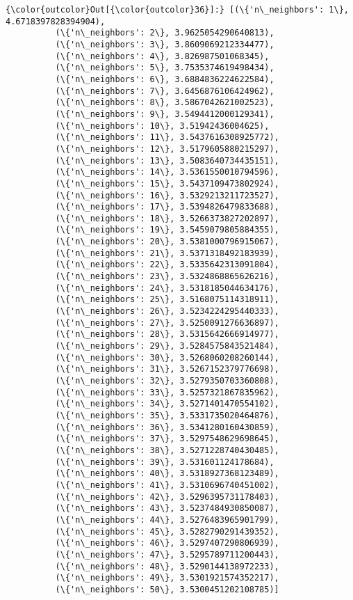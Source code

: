 \documentclass[11pt]{article}
\begin{document}
            \begin{Verbatim}[commandchars=\\\{\}]
{\color{outcolor}Out[{\color{outcolor}36}]:} [(\{'n\_neighbors': 1\}, 4.6718397828394904),
          (\{'n\_neighbors': 2\}, 3.9625054290640813),
          (\{'n\_neighbors': 3\}, 3.8609069212334477),
          (\{'n\_neighbors': 4\}, 3.826987501068345),
          (\{'n\_neighbors': 5\}, 3.7535374619498434),
          (\{'n\_neighbors': 6\}, 3.6884836224622584),
          (\{'n\_neighbors': 7\}, 3.6456876106424962),
          (\{'n\_neighbors': 8\}, 3.5867042621002523),
          (\{'n\_neighbors': 9\}, 3.5494412000129341),
          (\{'n\_neighbors': 10\}, 3.51942436004625),
          (\{'n\_neighbors': 11\}, 3.5437616308925772),
          (\{'n\_neighbors': 12\}, 3.5179605880215297),
          (\{'n\_neighbors': 13\}, 3.5083640734435151),
          (\{'n\_neighbors': 14\}, 3.5361550010794596),
          (\{'n\_neighbors': 15\}, 3.5437109473802924),
          (\{'n\_neighbors': 16\}, 3.5329213211723527),
          (\{'n\_neighbors': 17\}, 3.5394826479833688),
          (\{'n\_neighbors': 18\}, 3.5266373827202897),
          (\{'n\_neighbors': 19\}, 3.5459079805884355),
          (\{'n\_neighbors': 20\}, 3.5381000796915067),
          (\{'n\_neighbors': 21\}, 3.5371318492183939),
          (\{'n\_neighbors': 22\}, 3.5335642313091804),
          (\{'n\_neighbors': 23\}, 3.5324868865626216),
          (\{'n\_neighbors': 24\}, 3.5318185044634176),
          (\{'n\_neighbors': 25\}, 3.5168075114318911),
          (\{'n\_neighbors': 26\}, 3.5234224295440333),
          (\{'n\_neighbors': 27\}, 3.5250091276636897),
          (\{'n\_neighbors': 28\}, 3.5315642666914977),
          (\{'n\_neighbors': 29\}, 3.5284575843521484),
          (\{'n\_neighbors': 30\}, 3.5268060208260144),
          (\{'n\_neighbors': 31\}, 3.5267152379776698),
          (\{'n\_neighbors': 32\}, 3.5279350703360808),
          (\{'n\_neighbors': 33\}, 3.5257321867835962),
          (\{'n\_neighbors': 34\}, 3.5271401470554102),
          (\{'n\_neighbors': 35\}, 3.5331735020464876),
          (\{'n\_neighbors': 36\}, 3.5341280160430859),
          (\{'n\_neighbors': 37\}, 3.5297548629698645),
          (\{'n\_neighbors': 38\}, 3.5271228740430485),
          (\{'n\_neighbors': 39\}, 3.531601124178684),
          (\{'n\_neighbors': 40\}, 3.5318927368123489),
          (\{'n\_neighbors': 41\}, 3.5310696740451002),
          (\{'n\_neighbors': 42\}, 3.5296395731178403),
          (\{'n\_neighbors': 43\}, 3.5237484930850087),
          (\{'n\_neighbors': 44\}, 3.5276483965901799),
          (\{'n\_neighbors': 45\}, 3.5282790291439352),
          (\{'n\_neighbors': 46\}, 3.5297407290806939),
          (\{'n\_neighbors': 47\}, 3.5295789711200443),
          (\{'n\_neighbors': 48\}, 3.5290144138972233),
          (\{'n\_neighbors': 49\}, 3.5301921574352217),
          (\{'n\_neighbors': 50\}, 3.5300451202108785)]
\end{Verbatim}
        
\end{document}
